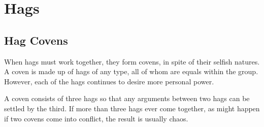
\vfill\eject

\vfill\eject

\vfill\eject



\vfill\eject

\vfill\eject


\vfill\eject

\vfill\eject

\vfill\eject

\vfill\eject

\clearpage

\clearpage
\chapter*{Hags}

\vfill\eject

\vfill\eject

\vfill\eject
\section*{Hag Covens}
{\entryfont When hags must work together, they form covens, in spite of their selfish natures. A coven is made up of hags of any type, all of whom are equals within the group. However, each of the hags continues to desire more personal power.

A coven consists of three hags so that any arguments between two hags can be settled by the third. If more than three hags ever come together, as might happen if two covens come into conflict, the result is usually chaos.}

